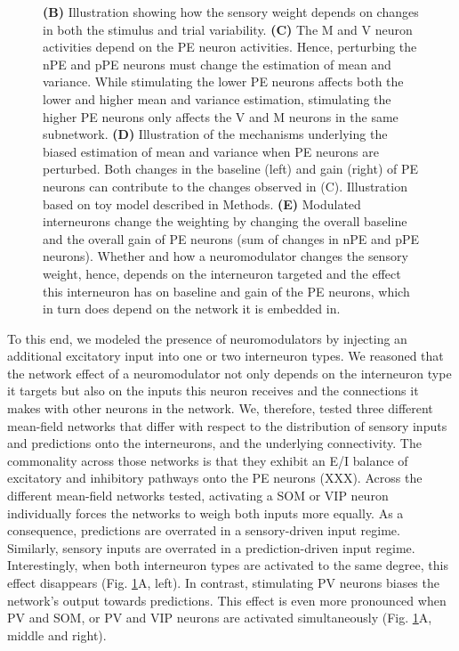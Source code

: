 \documentclass[10pt,a4paper]{article}
\begin{document}
\begin{figure}[t!]
{{\bf (B)} Illustration showing how the sensory weight depends on changes in both the stimulus and trial variability.
{\bf (C)} The M and V neuron activities depend on the PE neuron activities. Hence, perturbing the nPE and pPE neurons must change the estimation of mean and variance. While stimulating the lower PE neurons affects both the lower and higher mean and variance estimation, stimulating the higher PE neurons only affects the V and M neurons in the same subnetwork.
{\bf (D)} Illustration of the mechanisms underlying the biased estimation of mean and variance when PE neurons are perturbed. Both changes in the baseline (left) and gain (right) of PE neurons can contribute to the changes observed in (C). Illustration based on toy model described in Methods.
{\bf (E)} Modulated interneurons change the weighting by changing the overall baseline and the overall gain of PE neurons (sum of changes in nPE and pPE neurons). Whether and how a neuromodulator changes the sensory weight, hence, depends on the interneuron targeted and the effect this interneuron has on baseline and gain of the PE neurons, which in turn does depend on the network it is embedded in.
}
\label{fig:Fig_4}
\end{figure}
%

To this end, we modeled the presence of neuromodulators by injecting an additional excitatory input into one or two interneuron types. We reasoned that the network effect of a neuromodulator not only depends on the interneuron type it targets but also on the inputs this neuron receives and the connections it makes with other neurons in the network. We, therefore, tested three different mean-field networks that differ with respect to the distribution of sensory inputs and predictions onto the interneurons, and the underlying connectivity. The commonality across those networks is that they exhibit an E/I balance of excitatory and inhibitory pathways onto the PE neurons (XXX). Across the different mean-field networks tested, activating a SOM or VIP neuron individually forces the networks to weigh both inputs more equally. As a consequence, predictions are overrated in a sensory-driven input regime. Similarly, sensory inputs are overrated in a prediction-driven input regime. Interestingly, when both interneuron types are activated to the same degree, this effect disappears (Fig. \ref{fig:Fig_4}A, left). In contrast, stimulating PV neurons biases the network's output towards predictions. This effect is even more pronounced when PV and SOM, or PV and VIP neurons are activated simultaneously (Fig. \ref{fig:Fig_4}A, middle and right). 
\end{document}
